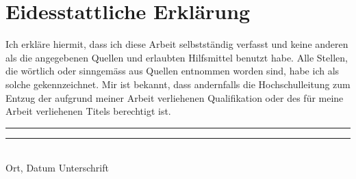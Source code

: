 
\section*{Eidesstattliche Erklärung}
Ich erkläre hiermit, dass ich diese Arbeit selbstständig verfasst und keine anderen als die angegebenen Quellen und erlaubten Hilfsmittel benutzt habe. Alle Stellen, die wörtlich oder sinngemäss aus Quellen entnommen worden sind, habe ich als solche gekennzeichnet. Mir ist bekannt, dass andernfalls die Hochschulleitung zum Entzug der aufgrund meiner Arbeit verliehenen Qualifikation oder des für meine Arbeit verliehenen Titels berechtigt ist. 

\vspace{3cm}
\noindent\rule{6cm}{0.4pt} \hfill \rule{6cm}{0.4pt}\\ 
Ort, Datum \hspace{7.4cm} Unterschrift 
